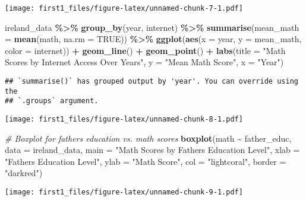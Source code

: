 \documentclass[
]{article}
\newenvironment{Shaded}{\begin{snugshade}}{\end{snugshade}}
\newcommand{\AttributeTok}[1]{\textcolor[rgb]{0.13,0.29,0.53}{#1}}
\newcommand{\CommentTok}[1]{\textcolor[rgb]{0.56,0.35,0.01}{\textit{#1}}}
\newcommand{\ConstantTok}[1]{\textcolor[rgb]{0.56,0.35,0.01}{#1}}
\newcommand{\FunctionTok}[1]{\textcolor[rgb]{0.13,0.29,0.53}{\textbf{#1}}}
\newcommand{\NormalTok}[1]{#1}
\newcommand{\SpecialCharTok}[1]{\textcolor[rgb]{0.81,0.36,0.00}{\textbf{#1}}}
\newcommand{\StringTok}[1]{\textcolor[rgb]{0.31,0.60,0.02}{#1}}
\begin{document}
\texttt{[image: first1\_files/figure-latex/unnamed-chunk-7-1.pdf]}

\begin{Shaded}
\begin{Highlighting}[]
\NormalTok{ireland\_data }\SpecialCharTok{\%\textgreater{}\%}
  \FunctionTok{group\_by}\NormalTok{(year, internet) }\SpecialCharTok{\%\textgreater{}\%}
  \FunctionTok{summarise}\NormalTok{(}\AttributeTok{mean\_math =} \FunctionTok{mean}\NormalTok{(math, }\AttributeTok{na.rm =} \ConstantTok{TRUE}\NormalTok{)) }\SpecialCharTok{\%\textgreater{}\%}
  \FunctionTok{ggplot}\NormalTok{(}\FunctionTok{aes}\NormalTok{(}\AttributeTok{x =}\NormalTok{ year, }\AttributeTok{y =}\NormalTok{ mean\_math, }\AttributeTok{color =}\NormalTok{ internet)) }\SpecialCharTok{+}
  \FunctionTok{geom\_line}\NormalTok{() }\SpecialCharTok{+} \FunctionTok{geom\_point}\NormalTok{() }\SpecialCharTok{+}
  \FunctionTok{labs}\NormalTok{(}\AttributeTok{title =} \StringTok{"Math Scores by Internet Access Over Years"}\NormalTok{, }\AttributeTok{y =} \StringTok{"Mean Math Score"}\NormalTok{, }\AttributeTok{x =} \StringTok{"Year"}\NormalTok{)}
\end{Highlighting}
\end{Shaded}

\begin{verbatim}
## `summarise()` has grouped output by 'year'. You can override using the
## `.groups` argument.
\end{verbatim}

\texttt{[image: first1\_files/figure-latex/unnamed-chunk-8-1.pdf]}

\begin{Shaded}
\begin{Highlighting}[]
\CommentTok{\# Boxplot for father\textquotesingle{}s education vs. math scores}
\FunctionTok{boxplot}\NormalTok{(math }\SpecialCharTok{\textasciitilde{}}\NormalTok{ father\_educ, }\AttributeTok{data =}\NormalTok{ ireland\_data, }
        \AttributeTok{main =} \StringTok{"Math Scores by Father\textquotesingle{}s Education Level"}\NormalTok{,}
        \AttributeTok{xlab =} \StringTok{"Father\textquotesingle{}s Education Level"}\NormalTok{, }\AttributeTok{ylab =} \StringTok{"Math Score"}\NormalTok{,}
        \AttributeTok{col =} \StringTok{"lightcoral"}\NormalTok{, }\AttributeTok{border =} \StringTok{"darkred"}\NormalTok{)}
\end{Highlighting}
\end{Shaded}

\texttt{[image: first1\_files/figure-latex/unnamed-chunk-9-1.pdf]}
\end{document}
